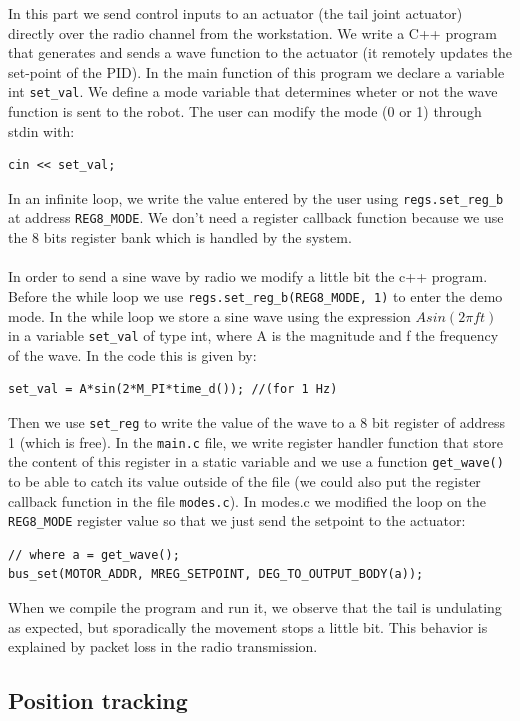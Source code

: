 \documentclass[11pt]{article}
\begin{document}
In this part we send control inputs to an actuator (the tail joint actuator) directly over the radio channel from the workstation. We write a C++ program that generates and sends a wave function to the actuator (it remotely updates the set-point of the PID). In the main function of this program we declare a variable int \texttt{set\_val}. We define a mode variable that determines wheter or not the wave function is sent to the robot. The user can modify the mode (0 or 1) through stdin with:
\begin{verbatim}
cin << set_val;
\end{verbatim}
In an infinite loop, we write the value entered by the user using \texttt{regs.set\_reg\_b} at address \texttt{REG8\_MODE}. We don't need a register callback function because we use the 8 bits register bank which is handled by the system.
\\
\\
In order to send a sine wave by radio we modify a little bit the c++ program. Before the while loop we use \texttt{regs.set\_reg\_b(REG8\_MODE, 1)} to enter the demo mode. In the while loop we store a sine wave using the expression ${Asin(2{\pi}ft)}$ in a variable \texttt{set\_val} of type int, where A is the magnitude and f the frequency of the wave. In the code this is given by:
\begin{verbatim}
set_val = A*sin(2*M_PI*time_d()); //(for 1 Hz)
\end{verbatim}
Then we use \texttt{set\_reg} to write the value of the wave to a 8 bit register of address 1 (which is free). In the \texttt{main.c} file, we write register handler function that store the content of this register in a static variable and we use a function \texttt{get\_wave()} to be able to catch its value outside of the file (we could also put the register callback function in the file \texttt{modes.c}). In modes.c we modified the loop on the \texttt{REG8\_MODE} register value so that we just send the setpoint to the actuator:
\begin{verbatim}
// where a = get_wave();
bus_set(MOTOR_ADDR, MREG_SETPOINT, DEG_TO_OUTPUT_BODY(a));
\end{verbatim}
When we compile the program and run it, we observe that the tail is undulating as expected, but sporadically the movement stops a little bit. This behavior is explained by packet loss in the radio transmission.


\subsection{Position tracking}
\label{subsection:position_track}
\end{document}
